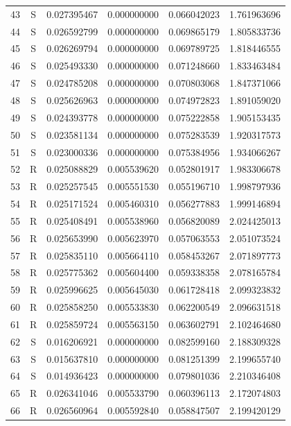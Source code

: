 \documentclass[11pt,a4paper]{article}
\theoremstyle{definition}
\theoremstyle{remark}
\begin{document}
\begin{longtable}{rcrrrr}
43 & S & 0.027395467 & 0.000000000 & 0.066042023 & 1.761963696 \\
44 & S & 0.026592799 & 0.000000000 & 0.069865179 & 1.805833736 \\
45 & S & 0.026269794 & 0.000000000 & 0.069789725 & 1.818446555 \\
46 & S & 0.025493330 & 0.000000000 & 0.071248660 & 1.833463484 \\
47 & S & 0.024785208 & 0.000000000 & 0.070803068 & 1.847371066 \\
48 & S & 0.025626963 & 0.000000000 & 0.074972823 & 1.891059020 \\
49 & S & 0.024393778 & 0.000000000 & 0.075222858 & 1.905153435 \\
50 & S & 0.023581134 & 0.000000000 & 0.075283539 & 1.920317573 \\
51 & S & 0.023000336 & 0.000000000 & 0.075384956 & 1.934066267 \\
52 & R & 0.025088829 & 0.005539620 & 0.052801917 & 1.983306678 \\
53 & R & 0.025257545 & 0.005551530 & 0.055196710 & 1.998797936 \\
54 & R & 0.025171524 & 0.005460310 & 0.056277883 & 1.999146894 \\
55 & R & 0.025408491 & 0.005538960 & 0.056820089 & 2.024425013 \\
56 & R & 0.025653990 & 0.005623970 & 0.057063553 & 2.051073524 \\
57 & R & 0.025835110 & 0.005664110 & 0.058453267 & 2.071897773 \\
58 & R & 0.025775362 & 0.005604400 & 0.059338358 & 2.078165784 \\
59 & R & 0.025996625 & 0.005645030 & 0.061728418 & 2.099323832 \\
60 & R & 0.025858250 & 0.005533830 & 0.062200549 & 2.096631518 \\
61 & R & 0.025859724 & 0.005563150 & 0.063602791 & 2.102464680 \\
62 & S & 0.016206921 & 0.000000000 & 0.082599160 & 2.188309328 \\
63 & S & 0.015637810 & 0.000000000 & 0.081251399 & 2.199655740 \\
64 & S & 0.014936423 & 0.000000000 & 0.079801036 & 2.210346408 \\
65 & R & 0.026341046 & 0.005533790 & 0.060396113 & 2.172074803 \\
66 & R & 0.026560964 & 0.005592840 & 0.058847507 & 2.199420129 \\
\bottomrule
\end{longtable}
\end{document}

